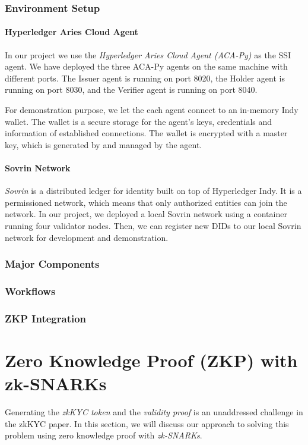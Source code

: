 \documentclass[
]{report}
\begin{document}
\subsection{Environment Setup}
\subsubsection{Hyperledger Aries Cloud Agent}
In our project we use the \emph{Hyperledger Aries Cloud Agent (ACA-Py)}
as the SSI agent. We have deployed the three ACA-Py agents on the same
machine with different ports. The Issuer agent is running on port 8020,
the Holder agent is running on port 8030, and the Verifier agent is
running on port 8040.

For demonstration purpose, we let the each agent connect to an in-memory
Indy wallet. The wallet is a secure storage for the agent's keys,
credentials and information of established connections. The wallet is
encrypted with a master key, which is generated by and managed by the
agent.

\subsubsection{Sovrin Network}
\emph{Sovrin} is a distributed ledger for identity built on top of
Hyperledger Indy. It is a permissioned network, which means that only
authorized entities can join the network. In our project, we deployed a
local Sovrin network using a container running four validator nodes.
Then, we can register new DIDs to our local Sovrin network for development
and demonstration.

\subsection{Major Components}

\subsection{Workflows}
\subsection{ZKP Integration}

\chapter{Zero Knowledge Proof (ZKP) with zk-SNARKs}

Generating the \emph{zkKYC token} and the \emph{validity proof} is an
unaddressed challenge in the zkKYC paper. In this section, we will
discuss our approach to solving this problem using zero knowledge proof
with \emph{zk-SNARKs}.
\end{document}
